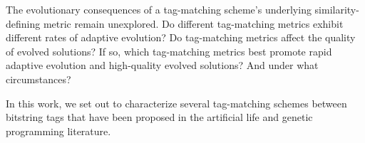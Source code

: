 

The evolutionary consequences of a tag-matching scheme's underlying similarity-defining metric remain unexplored.
Do different tag-matching metrics exhibit different rates of adaptive evolution?
Do tag-matching metrics affect the quality of evolved solutions?
If so, which tag-matching metrics best promote rapid adaptive evolution and high-quality evolved solutions?
And under what circumstances?

In this work, we set out to characterize several tag-matching schemes between bitstring tags that have been proposed in the artificial life and genetic programming literature.




